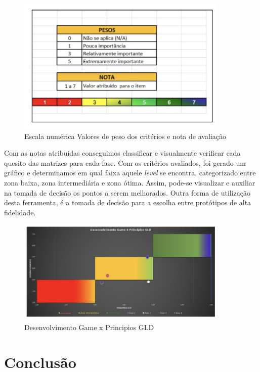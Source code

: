 \documentclass[12pt, onecolumn]{IEEEtran}
\begin{document}
\begin{figure}[H]
    \centering
    \includegraphics[width=0.9\textwidth]{imagens/conclusao-5.png}
    \caption{Escala numérica Valores de peso dos critérios e nota de avaliação}
    \label{fig:mesh1}
\end{figure}

Com as notas atribuídas conseguimos classificar e visualmente verificar cada quesito das matrizes para cada fase. Com os critérios avaliados, foi gerado um gráfico e determinamos em  qual faixa aquele \textit{level} se encontra, categorizado entre zona baixa, zona intermediária e zona ótima. Assim, pode-se visualizar e auxiliar na tomada de decisão os pontos a serem melhorados. Outra forma de utilização desta ferramenta, é a tomada de decisão para a escolha entre protótipos de alta fidelidade.

\begin{figure}[H]
    \centering
    \includegraphics[width=0.9\textwidth]{imagens/conclusao-6.png}
    \caption{Desenvolvimento Game x Principios GLD}
    \label{fig:mesh1}
\end{figure}

\section{Conclusão}
\end{document}
